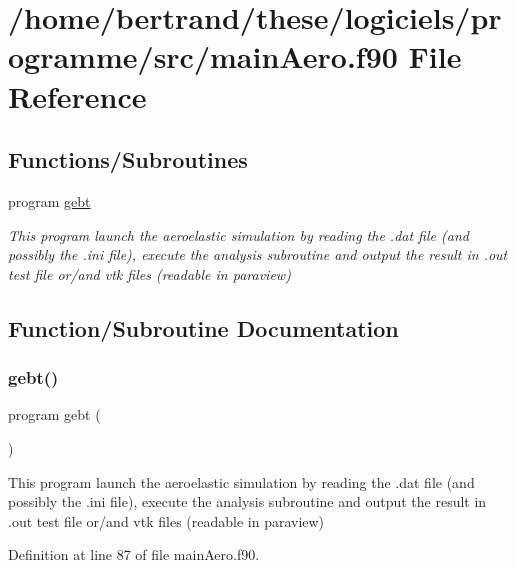 \hypertarget{main_aero_8f90}{}\section{/home/bertrand/these/logiciels/programme/src/main\+Aero.f90 File Reference}
\label{main_aero_8f90}
\subsection*{Functions/\+Subroutines}
\begin{DoxyCompactItemize}
\item 
program \hyperlink{main_aero_8f90_a8cc802272376d835be44956439f13f15}{gebt}
\begin{DoxyCompactList}\small\item\em This program launch the aeroelastic simulation by reading the .dat file (and possibly the .ini file), execute the analysis subroutine and output the result in .out test file or/and vtk files (readable in paraview) \end{DoxyCompactList}\end{DoxyCompactItemize}


\subsection{Function/\+Subroutine Documentation}
\mbox{\label{main_aero_8f90_a8cc802272376d835be44956439f13f15}} 
\subsubsection{\texorpdfstring{gebt()}{gebt()}}
{\footnotesize\ttfamily program gebt (\begin{DoxyParamCaption}{ }\end{DoxyParamCaption})}



This program launch the aeroelastic simulation by reading the .dat file (and possibly the .ini file), execute the analysis subroutine and output the result in .out test file or/and vtk files (readable in paraview) 



Definition at line 87 of file main\+Aero.\+f90.


